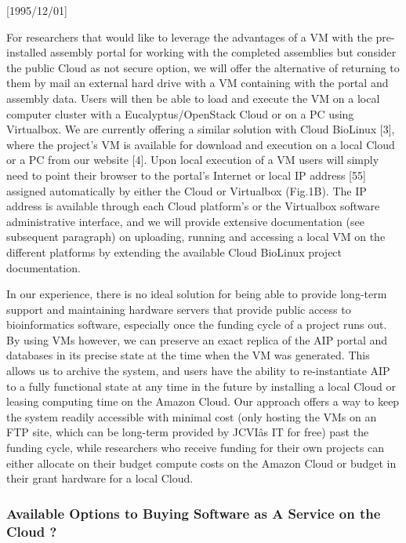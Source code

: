 \NeedsTeXFormat{LaTeX2e}[1995/12/01] \documentclass[10pt]{bmc_article}
\newenvironment{bmcformat}{\begin{raggedright}\baselineskip20pt\sloppy\setboolean{publ}{false}}{\end{raggedright}\baselineskip20pt\sloppy}
\begin{document}
\begin{bmcformat}
 For researchers that would like to leverage the advantages of a VM with the pre-installed assembly portal for
 working with the completed assemblies but consider the public Cloud as not secure option, we will offer the
 alternative of returning to them by mail an external hard drive with a VM containing with the portal and
 assembly data. Users will then be able to load and execute the VM on a local computer cluster with a
 Eucalyptus/OpenStack Cloud or on a PC using Virtualbox. We are currently offering a similar solution with
 Cloud BioLinux [3], where the project's VM is available for download and execution on a local Cloud or a PC
 from our website [4].  Upon local execution of a VM users will simply need to point their browser to the
 portal's Internet or local IP address [55] assigned automatically by either the Cloud or Virtualbox (Fig.1B).
 The IP address is available through each Cloud platform's or the Virtualbox software administrative
 interface, and we will provide extensive documentation (see subsequent paragraph) on uploading, running and
 accessing a local VM on the different platforms by extending the available Cloud BioLinux project
 documentation.

In our experience, there is no ideal solution for being able to provide long-term support and maintaining
hardware servers that provide public access to bioinformatics software, especially once the funding cycle of a
project runs out.  By using VMs however, we can preserve an exact replica of the AIP portal and databases in
its precise state at the time when the VM was generated. This allows us to archive the system, and users have
the ability to re-instantiate AIP to a fully functional state at any time in the future by installing a local
Cloud or leasing computing time on the Amazon Cloud. Our approach offers a way to keep the system readily
accessible with minimal cost (only hosting the VMs on an FTP site, which can be long-term provided by JCVIâs
IT for free) past the funding cycle, while researchers who receive funding for their own projects can either
allocate on their budget compute costs on the Amazon Cloud or budget in their grant hardware for a local
Cloud.

\subsubsection*{Available Options to Buying Software as A Service on the Cloud ?}


\end{bmcformat}
\end{document}
